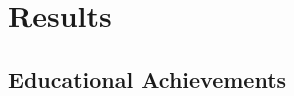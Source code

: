 \chapter{Results}\label{ch:results}
\section{Educational Achievements}\label{sec:educational-achievements}
